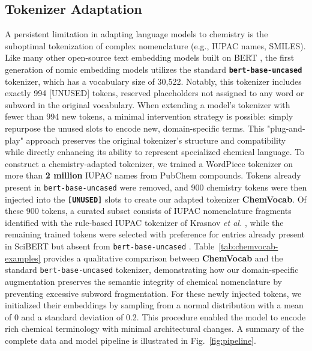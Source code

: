 \documentclass[twoside,twocolumn,9pt]{article}
\begin{document}
\subsection{Tokenizer Adaptation}
A persistent limitation in adapting language models to chemistry is the suboptimal tokenization of complex nomenclature (e.g., IUPAC names, SMILES). Like many other open-source text embedding models built on BERT \cite{devlin2019bert}, the first generation of nomic embedding models utilizes the standard \textbf{\texttt{bert-base-uncased}} tokenizer, which has a vocabulary size of 30,522. Notably, this tokenizer includes exactly 994 [UNUSED] tokens, reserved placeholders not assigned to any word or subword in the original vocabulary. When extending a model's tokenizer with fewer than 994 new tokens, a minimal intervention strategy is possible: simply repurpose the unused slots to encode new, domain-specific terms. This "plug-and-play" approach preserves the original tokenizer’s structure and compatibility while directly enhancing its ability to represent specialized chemical language. To construct a chemistry-adapted tokenizer, we trained a WordPiece tokenizer \cite{wu2016google} on more than \textbf{2 million} IUPAC names from PubChem compounds. Tokens already present in \texttt{bert-base-uncased} were removed, and 900 chemistry tokens were then injected into the \textbf{\texttt{[UNUSED]}} slots to create our adapted tokenizer \textbf{ChemVocab}. Of these 900 tokens, a curated subset consists of IUPAC nomenclature fragments identified with the rule-based IUPAC tokenizer of Krasnov \textit{et al.} \cite{krasnov2021transformer}, while the remaining trained tokens were selected with preference for entries already present in SciBERT but absent from \texttt{bert-base-uncased} \cite{beltagy2019scibert}. Table~\ref{tab:chemvocab-examples} provides a qualitative comparison between \textbf{ChemVocab} and the standard \texttt{bert-base-uncased} tokenizer, demonstrating how our domain-specific augmentation preserves the semantic integrity of chemical nomenclature by preventing excessive subword fragmentation. For these newly injected tokens, we initialized their embeddings by sampling from a normal distribution with a mean of 0 and a standard deviation of 0.2. This procedure enabled the model to encode rich chemical terminology with minimal architectural changes. A summary of the complete data and model pipeline is illustrated in Fig.~\ref{fig:pipeline}.
\end{document}
